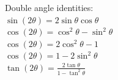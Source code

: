 \documentclass[10pt,landscape,a4paper]{article}
\begin{document}
\begin{multicols*}{5}



  Double angle identities: \\
  \(\sin (2 \theta) = 2 \sin \theta \cos \theta\) \\
  \(\cos (2 \theta) = \cos^2 \theta - \sin^2 \theta\) \\
  \(\cos (2 \theta) = 2 \cos^2 \theta - 1\) \\
  \(\cos (2 \theta) = 1 - 2 \sin^2 \theta\) \\
  \(\tan (2 \theta) = \frac{2 \tan \theta}{1 - \tan^2 \theta}\)



\end{multicols*}
\end{document}
